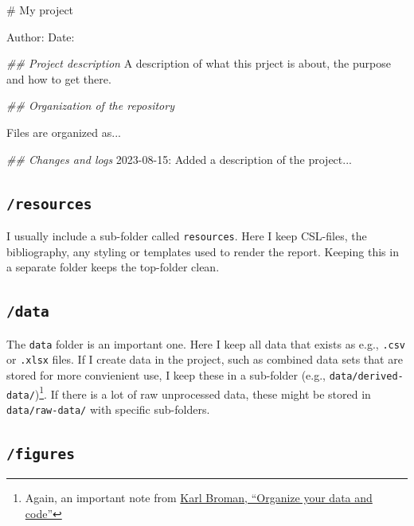 \documentclass[
  11pt,
  letterpaper,
]{scrbook}
\newenvironment{Shaded}{\begin{snugshade}}{\end{snugshade}}
\newcommand{\CommentTok}[1]{\textcolor[rgb]{0.37,0.37,0.37}{#1}}
\newcommand{\DecValTok}[1]{\textcolor[rgb]{0.68,0.00,0.00}{#1}}
\newcommand{\DocumentationTok}[1]{\textcolor[rgb]{0.37,0.37,0.37}{\textit{#1}}}
\newcommand{\NormalTok}[1]{\textcolor[rgb]{0.00,0.23,0.31}{#1}}
\newcommand{\SpecialCharTok}[1]{\textcolor[rgb]{0.37,0.37,0.37}{#1}}
\begin{document}
\begin{Shaded}
\begin{Highlighting}[numbers=left,,]
\CommentTok{\# My project}

\NormalTok{Author}\SpecialCharTok{:} 
\NormalTok{Date}\SpecialCharTok{:} 

\DocumentationTok{\#\# Project description }
\NormalTok{A description of what this prject is about, the }
\NormalTok{purpose and how to get there. }

\DocumentationTok{\#\# Organization of the repository}

\NormalTok{Files are organized as...}

\DocumentationTok{\#\# Changes and logs}
\DecValTok{2023{-}08{-}15}\SpecialCharTok{:}\NormalTok{ Added a description of the project...}
\end{Highlighting}
\end{Shaded}

\hypertarget{resources-2}{%
\subsection{\texorpdfstring{\texttt{/resources}}{/resources}}\label{resources-2}}

I usually include a sub-folder called \texttt{resources}. Here I keep
CSL-files, the bibliography, any styling or templates used to render the
report. Keeping this in a separate folder keeps the top-folder clean.

\hypertarget{data}{%
\subsection{\texorpdfstring{\texttt{/data}}{/data}}\label{data}}

The \texttt{data} folder is an important one. Here I keep all data that
exists as e.g., \texttt{.csv} or \texttt{.xlsx} files. If I create data
in the project, such as combined data sets that are stored for more
convienient use, I keep these in a sub-folder (e.g.,
\texttt{data/derived-data/})\footnote{Again, an important note from
  \href{https://kbroman.org/steps2rr/pages/organize.html}{Karl Broman,
  ``Organize your data and code''}}. If there is a lot of raw
unprocessed data, these might be stored in \texttt{data/raw-data/} with
specific sub-folders.

\hypertarget{figures}{%
\subsection{\texorpdfstring{\texttt{/figures}}{/figures}}\label{figures}}
\end{document}
